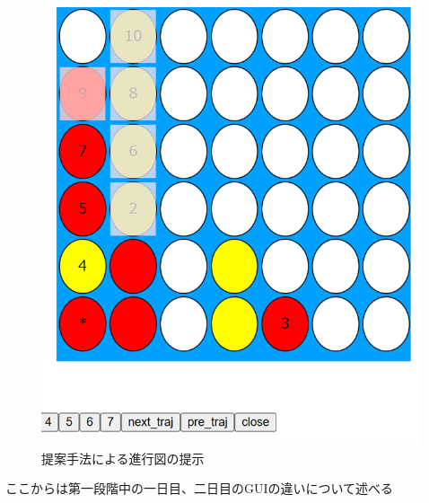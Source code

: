 \begin{figure}[t]
	\centering
	\includegraphics[width=\linewidth]{./figure/multi.png}
	\caption{提案手法による進行図の提示}
	\label{fig:multi}
\end{figure}
ここからは第一段階中の一日目、二日目のGUIの違いについて述べる
